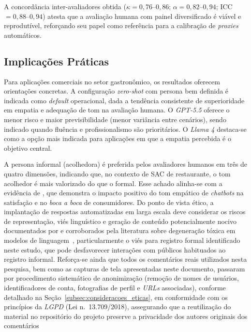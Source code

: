 \documentclass[12pt, a4paper]{article}
\numberwithin{equation}{section}
\begin{document}
A concordância inter-avaliadores obtida ($\kappa = 0{,}76$--$0{,}86$; $\alpha = 0{,}82$--$0{,}94$; ICC $= 0{,}88$--$0{,}94$) atesta que a avaliação humana com painel diversificado é viável e reprodutível, reforçando seu papel como referência para a calibração de \textit{proxies} automáticos.

\subsection{Implicações Práticas}
\label{subsec:implicacoes}

Para aplicações comerciais no setor gastronômico, os resultados oferecem orientações concretas. A configuração \textit{zero-shot} com persona bem definida é indicada como \textit{default} operacional, dada a tendência consistente de superioridade em empatia e adequação de tom na avaliação humana. O \textit{GPT-5.5} oferece o menor risco e maior previsibilidade (menor variância entre cenários), sendo indicado quando fluência e profissionalismo são prioritários. O \textit{Llama 4} destaca-se como a opção mais indicada para aplicações em que a empatia percebida é o objetivo central.

A persona informal (acolhedora) é preferida pelos avaliadores humanos em três de quatro dimensões, indicando que, no contexto de SAC de restaurante, o tom acolhedor é mais valorizado do que o formal. Esse achado alinha-se com a evidência de , que demonstra o impacto positivo do tom empático de \textit{chatbots} na satisfação e no \textit{boca a boca} de consumidores. Do ponto de vista ético, a implantação de respostas automatizadas em larga escala deve considerar os riscos de representação, viés linguístico e geração de conteúdo potencialmente nocivo documentados por  e corroborados pela literatura sobre degeneração tóxica em modelos de linguagem~\cite{gehman2020, hartvigsen2022}, particularmente o viés para registro formal identificado neste estudo, que pode desfavorecer interações com públicos habituados ao registro informal. Reforça-se ainda que todos os comentários reais utilizados nesta pesquisa, bem como as capturas de tela apresentadas neste documento, passaram por procedimento sistemático de anonimização (remoção de nomes de usuários, identificadores de conta, fotografias de perfil e \textit{URLs} associadas), conforme detalhado na Seção~\ref{subsec:consideracoes_eticas}, em conformidade com os princípios da \textit{LGPD} (Lei n.\ 13.709/2018), assegurando que a reutilização do material no repositório do projeto preserve a privacidade dos autores originais dos comentários
\end{document}
